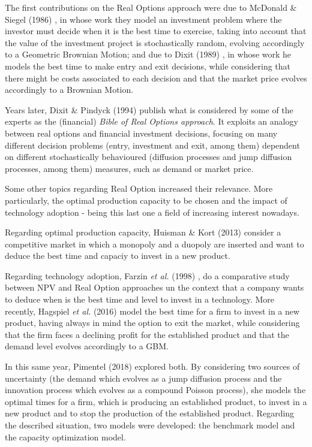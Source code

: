 The first contributions on the Real Options approach were due to McDonald \& Siegel (1986)  \cite{siegel}, in whose work they model an investment problem where the investor must decide when it is the best time to exercise, taking into account that the value of the investment project is stochastically random, evolving accordingly to a Geometric Brownian Motion; and due to Dixit (1989) \cite{dixit_alone}, in whose work he models the best time to make entry and exit decisions, while considering that there might be costs associated to each decision and that the market price evolves accordingly to a Brownian Motion.

Years later, Dixit \& Pindyck (1994) \cite{dixit:book} publish what is considered by some of the experts as the (financial) \textit{Bible of Real Options approach}. It exploits an analogy between real options and financial investment decisions, focusing on many different decision problems (entry, investment and exit, among them) dependent on different stochastically behavioured (diffusion processes and jump diffusion processes, among them) measures, such as demand or market price.

Some other topics regarding Real Option increased their relevance. More particularly, the optimal production capacity to be chosen and the impact of technology adoption - being this last one a field of increasing interest nowadays.

Regarding optimal production capacity, Huisman \& Kort (2013) \cite{huis:cap} consider a competitive market in which a monopoly and a duopoly are inserted and want to deduce the best time and capaciy to invest in a new product. 

Regarding technology adoption,
Farzin \textit{et al.} (1998) \cite{farzin:cap}, do a comparative study between NPV and Real Option approaches un the context that a company wants to deduce when is the best time and level to invest in a technology.
More recently, Hagspiel \textit{et al.} (2016) \cite{hagspiel:cap} model the best time for a firm to invest in a new product, having always in mind the option to exit the market, while considering that the firm faces a declining profit for the established product and that the demand level evolves accordingly to a GBM. %

In this same year, Pimentel (2018) \cite{rita} explored both. By considering two sources of uncertainty (the demand which evolves as a jump diffusion process and the innovation process which evolves as a compound Poisson process), she models the optimal times for a firm, which is producing an established product, to invest in a new product and to stop the production of the established product. Regarding the described situation, two models were developed: the benchmark model and the capacity optimization model.



